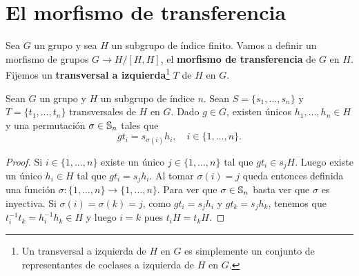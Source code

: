 \chapter{El morfismo de transferencia}


Sea $G$ un grupo y sea $H$ un subgrupo de índice finito. Vamos a definir un
morfismo de grupos $G\to H/[H,H]$, el \textbf{morfismo de transferencia} de $G$
en $H$. Fijemos un \textbf{transversal a izquierda}\footnote{Un transversal a
izquierda de $H$ en $G$ es simplemente un conjunto de representantes de coclases
a izquierda de $H$ en $G$.}  $T$ de $H$ en $G$.

\begin{lemma}
	\label{lemma:sigma}
	Sean $G$ un grupo y $H$ un subgrupo de índice $n$. Sean
	$S=\{s_1,\dots,s_n\}$ y $T=\{t_1,\dots,t_n\}$ transversales de $H$ en $G$.
	Dado $g\in G$, existen únicos $h_1,\dots,h_n\in H$ y una permutación
	$\sigma\in\mathbb{S}_n$  
	tales que
	\[
		gt_i=s_{\sigma(i)}h_i,\quad
		i\in\{1,\dots,n\}.
	\]
\end{lemma}

\begin{proof}
	Si $i\in\{1,\dots,n\}$ existe un único $j\in\{1,\dots,n\}$ tal que $gt_i\in
	s_jH$. Luego existe un único $h_i\in H$ tal que $gt_i=s_jh_i$. Al tomar
	$\sigma(i)=j$ queda entonces definida una función
	$\sigma\colon\{1,\dots,n\}\to\{1,\dots,n\}$.  Para ver que
	$\sigma\in\mathbb{S}_n$ basta ver que $\sigma$ es inyectiva. Si
	$\sigma(i)=\sigma(k)=j$, como $gt_i=s_jh_i$ y $gt_k=s_jh_k$, tenemos que
	$t_i^{-1}t_k=h_i^{-1}h_k\in H$ y luego $i=k$ pues $t_iH=t_kH$.
\end{proof}

%
%
%

